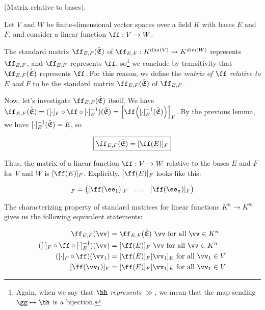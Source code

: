 \begin{deriv}
\label{ch::lin_alg::deriv::matrix_relative_to_bases}
    (Matrix relative to bases).
    
    Let $V$ and $W$ be finite-dimensional vector spaces over a field $K$ with bases $E$ and $F$, and consider a linear function $\ff:V \rightarrow W$. 
    
    The standard matrix $\ff_{E,F}(\sE)$ of $\ff_{E,F}:K^{\dim(V)} \rightarrow K^{\dim(W)}$ represents $\ff_{E,F}$, and $\ff_{E,F}$ represents $\ff$, so\footnote{Again, when we say that $\hh$ \textit{represents} $\gg$, we mean that the map sending $\gg \mapsto \hh$ is a bijection.} we conclude by transitivity that $\ff_{E,F}(\sE)$ represents $\ff$. For this reason, we define the \textit{matrix of $\ff$ relative to $E$ and $F$} to be the standard matrix $\ff_{E,F}(\sE)$ of $\ff_{E,F}$.
    
    Now, let's investigate $\ff_{E,F}(\sE)$ itself. We have $\ff_{E,F}(\sE) = ([\cdot]_F \circ \ff \circ [\cdot]_E^{-1})(\sE) = \Big[\ff\Big([\cdot]_E^{-1}(\sE)\Big)\Big]_F$. By the previous lemma, we have $[\cdot]_E^{-1}({\hat{\mathfrak{E}}}) = E$, so
    
    \begin{align*}
        \boxed
        {
            \ff_{E,F}(\sE) = [\ff(E)]_F
        }
    \end{align*}
    
    Thus, the matrix of a linear function $\ff:V \rightarrow W$ relative to the bases $E$ and $F$ for $V$ and $W$ is $[\ff(E)]_F$. Explicitly, $[\ff(E)]_F$ looks like this:
    
    \begin{align*}
        [\ff(E)]_F =
        \begin{pmatrix}
            [\ff(\ee_1)]_F & \hdots & [\ff(\ee_n)]_F
        \end{pmatrix}
    \end{align*}
    
    The characterizing property of standard matrices for linear functions $K^n \rightarrow K^m$ gives us the following equivalent statements:
    
    \begin{align*}
        \ff_{E,F}(\vv) &= \ff_{E,F}(\sE) \spc \vv \text{ for all $\vv \in K^n$} \\
        ([\cdot]_F \circ \ff \circ [\cdot]_E^{-1})(\vv) &= [\ff(E)]_F \spc \vv \text{ for all $\vv \in K^n$} \\
        ([\cdot]_F \circ \ff)(\vv_1) &= [\ff(E)]_F [\vv_1]_E \text{ for all $\vv_1 \in V$} \\
        [\ff(\vv_1)]_F &= [\ff(E)]_F [\vv_1]_E \text{ for all $\vv_1 \in V$}
    \end{align*}
    

\end{deriv}
